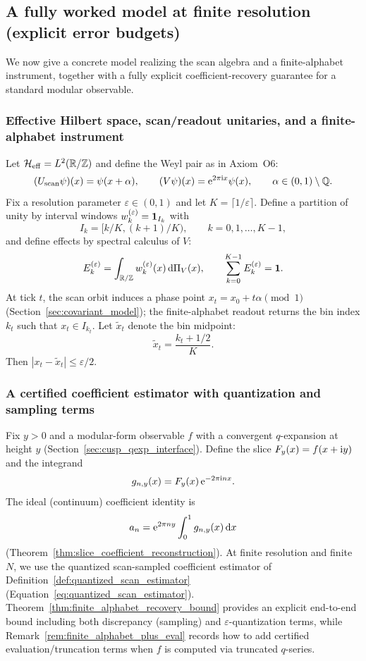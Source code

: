 \subsection{A fully worked model at finite resolution (explicit error budgets)}
\label{app:worked_model_finite_resolution}

We now give a concrete model realizing the scan algebra and a finite-alphabet instrument, together with a fully explicit coefficient-recovery guarantee for a standard modular observable.

\subsubsection{Effective Hilbert space, scan/readout unitaries, and a finite-alphabet instrument}
\label{app:worked_model_scan_instrument}

Let $\mathcal{H}_{\mathrm{eff}}=L^2(\mathbb{R}/\mathbb{Z})$ and define the Weyl pair as in Axiom~O6:
\[
(U_{\mathrm{scan}}\psi)(x)=\psi(x+\alpha),\qquad (V\psi)(x)=\mathrm{e}^{2\pi\mathrm{i} x}\psi(x),
\qquad \alpha\in(0,1)\setminus\mathbb{Q}.
\]
Fix a resolution parameter $\varepsilon\in(0,1)$ and let $K=\lceil 1/\varepsilon\rceil$.
Define a partition of unity by interval windows $w_k^{(\varepsilon)}=\mathbf{1}_{I_k}$ with
\[
I_k=[k/K,(k+1)/K),\qquad k=0,1,\ldots,K-1,
\]
and define effects by spectral calculus of $V$:
\[
E_k^{(\varepsilon)}=\int_{\mathbb{R}/\mathbb{Z}} w_k^{(\varepsilon)}(x)\,\mathrm{d}\Pi_V(x),
\qquad \sum_{k=0}^{K-1}E_k^{(\varepsilon)}=\mathbf{1}.
\]
At tick $t$, the scan orbit induces a phase point $x_t=x_0+t\alpha\pmod 1$ (Section~\ref{sec:covariant_model}); the finite-alphabet readout returns the bin index $k_t$ such that $x_t\in I_{k_t}$.
Let $\widetilde x_t$ denote the bin midpoint:
\[
\widetilde x_t=\frac{k_t+1/2}{K}.
\]
Then $|x_t-\widetilde x_t|\le \varepsilon/2$.

\subsubsection{A certified coefficient estimator with quantization and sampling terms}
\label{app:worked_model_estimator}

Fix $y>0$ and a modular-form observable $f$ with a convergent $q$-expansion at height $y$ (Section~\ref{sec:cusp_qexp_interface}).
Define the slice $F_y(x)=f(x+\mathrm{i} y)$ and the integrand
\[
g_{n,y}(x)=F_y(x)\,\mathrm{e}^{-2\pi\mathrm{i} n x}.
\]
The ideal (continuum) coefficient identity is
\[
a_n=\mathrm{e}^{2\pi n y}\int_0^1 g_{n,y}(x)\,\mathrm{d} x
\]
(Theorem~\ref{thm:slice_coefficient_reconstruction}).
At finite resolution and finite $N$, we use the quantized scan-sampled coefficient estimator of Definition~\ref{def:quantized_scan_estimator} (Equation~\ref{eq:quantized_scan_estimator}).
Theorem~\ref{thm:finite_alphabet_recovery_bound} provides an explicit end-to-end bound including both discrepancy (sampling) and $\varepsilon$-quantization terms, while Remark~\ref{rem:finite_alphabet_plus_eval} records how to add certified evaluation/truncation terms when $f$ is computed via truncated $q$-series.

